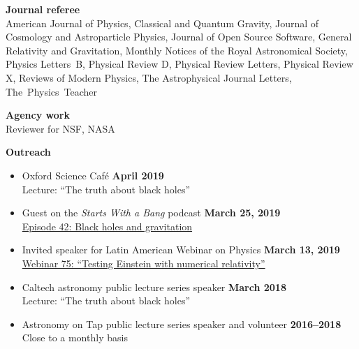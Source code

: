 \documentclass[margin,line]{res}
\begin{document}
\begin{resume}
  {\bf Journal referee}
  \vspace*{.05in}\\
  \hspace*{1em}
  American Journal of Physics,
  Classical and Quantum Gravity,
  Journal of Cosmology and Astroparticle Physics,
  Journal of Open Source Software,
  General Relativity and Gravitation,
  Monthly Notices of the Royal Astronomical Society,
  Physics Letters~B,
  Physical Review D,
  Physical Review Letters,
  Physical Review X,
  Reviews of Modern Physics,
  The Astrophysical Journal Letters,
  The~Physics~Teacher

  {\bf Agency work}
  \vspace*{.05in}\\
  \hspace*{1em}
  Reviewer for NSF, NASA

    {\bf Outreach}
  \vspace*{.05in}
  \begin{itemize}

    \item[] Oxford Science Café
      \hfill {\bf April 2019} \\
      \hspace*{1em} Lecture: ``The truth about black holes''

    \item[] Guest on the {\it Starts With a Bang} podcast
      \hfill {\bf March 25, 2019} \\
      \hspace*{1em}
      \href{https://soundcloud.com/ethan-siegel-172073460/starts-with-a-bang-42-black-holes-and-gravitation}{Episode 42: Black holes and gravitation}


    \item[] Invited speaker for Latin American Webinar on Physics
      \hfill {\bf March 13, 2019} \\
      \hspace*{1em} \href{https://www.youtube.com/watch?v=7HO07-QtvMI}
      {Webinar 75: ``Testing Einstein with numerical relativity''}

    \item[] Caltech astronomy public lecture series speaker
      \hfill {\bf March 2018} \\
      \hspace*{1em} Lecture: ``The truth about black holes''

    \item[] Astronomy on Tap public lecture series speaker and volunteer
      \hfill {\bf 2016--2018} \\
      \hspace*{1em} Close to a monthly basis


\end{itemize}
\end{resume}
\end{document}
